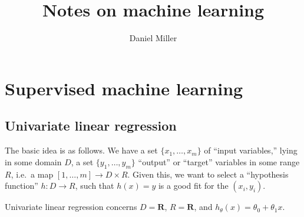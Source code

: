 \documentclass{article}
\title{Notes on machine learning}
\author{Daniel Miller}
\newcommand{\bR}{\mathbf{R}}
\begin{document}
\maketitle





\section{Supervised machine learning}


\subsection{Univariate linear regression}

The basic idea is as follows. We have a set $\{x_1,\dots,x_m\}$ of ``input 
variables,'' lying in some domain $D$, a set $\{y_1,\dots,y_m\}$ ``output'' or 
``target'' variables in some range $R$, i.e.~a map $[1,\dots,m]\to D\times R$. 
Given this, we want to select a ``hypothesis function'' $h\colon D\to R$, such 
that $h(x)=y$ is a good fit for the $(x_i,y_i)$. 

Univariate linear regression concerns $D=\bR$, $R=\bR$, and 
$h_\theta(x)=\theta_0+\theta_1 x$. 
\end{document}
